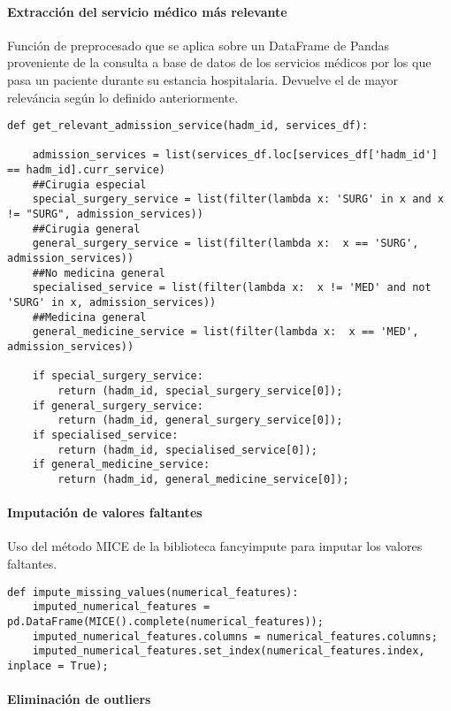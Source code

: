 \documentclass{report}
\begin{document}
\paragraph{Extracción del servicio médico más relevante}

Función de preprocesado que se aplica sobre un DataFrame de Pandas proveniente de la consulta a base de datos de los servicios médicos por los que pasa un paciente durante su estancia hospitalaria. Devuelve el de mayor releváncia según lo definido anteriormente. 

\begin{verbatim}
def get_relevant_admission_service(hadm_id, services_df):
    
    admission_services = list(services_df.loc[services_df['hadm_id'] == hadm_id].curr_service)
    ##Cirugia especial
    special_surgery_service = list(filter(lambda x: 'SURG' in x and x != "SURG", admission_services)) 
    ##Cirugia general
    general_surgery_service = list(filter(lambda x:  x == 'SURG', admission_services)) 
    ##No medicina general
    specialised_service = list(filter(lambda x:  x != 'MED' and not 'SURG' in x, admission_services)) 
    ##Medicina general
    general_medicine_service = list(filter(lambda x:  x == 'MED', admission_services)) 
    
    if special_surgery_service:
        return (hadm_id, special_surgery_service[0]);
    if general_surgery_service:
        return (hadm_id, general_surgery_service[0]);
    if specialised_service:
        return (hadm_id, specialised_service[0]);
    if general_medicine_service:
        return (hadm_id, general_medicine_service[0]);
\end{verbatim}

\paragraph{Imputación de valores faltantes}

Uso del método MICE de la biblioteca fancyimpute para imputar los valores faltantes.

\begin{verbatim}
def impute_missing_values(numerical_features):
    imputed_numerical_features = pd.DataFrame(MICE().complete(numerical_features));
    imputed_numerical_features.columns = numerical_features.columns;
    imputed_numerical_features.set_index(numerical_features.index, inplace = True);
\end{verbatim}

\paragraph{Eliminación de outliers}
\end{document}
